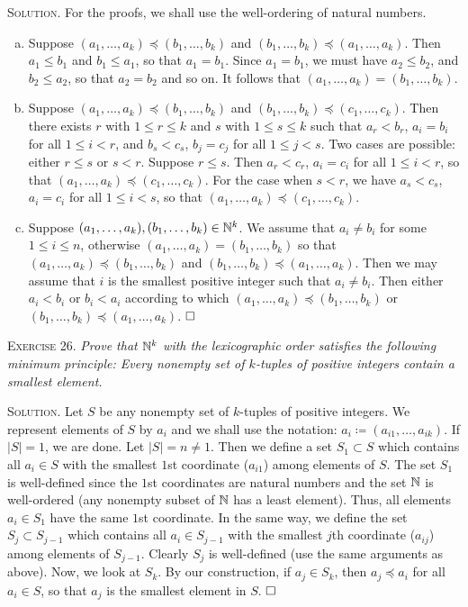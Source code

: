 \documentclass[11pt, leqno]{article}
\newcommand{\done}{\ensuremath{\hfill\square}}
\begin{document}
\textsc{Solution}. For the proofs, we shall use the well-ordering of natural numbers.
\begin{enumerate}[(a)]
\item\label{item:4} Suppose $(a_1,\ldots, a_k) \preceq (b_1,\ldots, b_k)$ and $(b_1,\ldots, b_k) \preceq (a_1, \ldots, a_k)$. Then $a_1 \leq b_1$ and $b_1 \leq a_1$, so that $a_1 = b_1$. Since $a_1 = b_1$, we must have $a_2 \leq b_2$, and $b_2 \leq a_2$, so that $a_2 = b_2$ and so on. It follows that $(a_1,\ldots, a_k) = (b_1, \ldots, b_k)$. 
\item\label{item:5} Suppose $(a_1,\ldots, a_k) \preceq (b_1,\ldots, b_k)$ and $(b_1,\ldots, b_k) \preceq (c_1, \ldots, c_k)$. Then there exists $r$ with $1 \leq r \leq k$ and $s$ with $1 \leq s \leq k$ such that $a_r < b_r$, $a_i = b_i$ for all $1 \leq i < r$, and $b_s < c_s$, $b_j = c_j$ for all $1 \leq j < s$. Two cases are possible: either $r \leq s$ or $s < r$. Suppose $r \leq s$. Then $a_r < c_r$, $a_i = c_i$ for all $1 \leq i < r$, so that $(a_1, \ldots, a_k) \preceq (c_1, \ldots, c_k)$. For the case when $s < r$, we have $a_s < c_s$, $a_i = c_i$ for all $1 \leq i < s$, so that $(a_1, \ldots, a_k) \preceq (c_1, \ldots, c_k)$.
\item\label{item:6} Suppose $(a_1, \ldots, a_k), (b_1, \ldots, b_k) \in \mathbb{N}^k$. We assume that $a_i \ne b_i$ for some $1 \leq i \leq n$, otherwise $(a_1, \ldots, a_k) = (b_1, \ldots, b_k)$ so that $(a_1, \ldots, a_k) \preceq (b_1, \ldots, b_k)$ and $(b_1, \ldots, b_k) \preceq (a_1, \ldots, a_k)$. Then we may assume that $i$ is the smallest positive integer such that $a_i \ne b_i$. Then either $a_i < b_i$ or $b_i < a_i$ according to which $(a_1, \ldots, a_k) \preceq (b_1, \ldots, b_k)$ or $(b_1, \ldots, b_k) \preceq (a_1, \ldots, a_k)$. \done
\end{enumerate}

\textsc{Exercise 26}. \emph{Prove that $\mathbb{N}^k$ with the lexicographic order satisfies the following minimum principle: Every nonempty set of $k$-tuples of positive integers contain a smallest element.}

\textsc{Solution}. Let $S$ be any nonempty set of $k$-tuples of positive integers. We represent elements of $S$ by $a_i$ and we shall use the notation: $a_i \coloneqq (a_{i1}, \ldots, a_{ik})$. If $|S| = 1$, we are done. Let $|S| = n \ne 1$. Then we define a set $S_1 \subset S$ which contains all $a_i \in S$ with the smallest $1$st coordinate ($a_{i1}$) among elements of $S$. The set $S_1$ is well-defined since the $1$st coordinates are natural numbers and the set $\mathbb{N}$ is well-ordered (any nonempty subset of $\mathbb{N}$ has a least element). Thus, all elements $a_i \in S_1$ have the same $1$st coordinate. In the same way, we define the set $S_j \subset S_{j-1}$ which contains all $a_i \in S_{j-1}$ with the smallest $j$th coordinate ($a_{ij}$) among elements of $S_{j-1}$. Clearly $S_j$ is well-defined (use the same arguments as above). Now, we look at $S_k$. By our construction, if $a_j \in S_k$, then $a_j \preceq a_i$ for all $a_i \in S$, so that $a_j$ is the smallest element in $S$. \done
\end{document}
